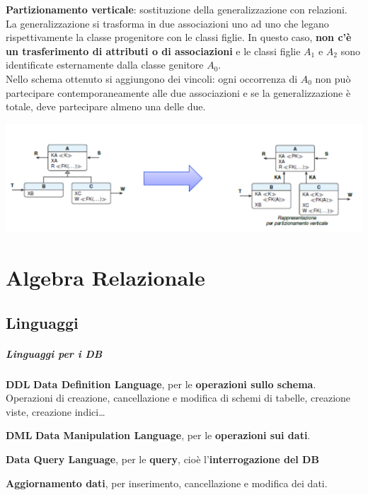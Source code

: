 \documentclass[10pt]{book}
\begin{document}
\begin{list}{}{}
\begin{center}
	\end{center}
	\item \textbf{Partizionamento verticale}: sostituzione della generalizzazione con relazioni.\\
	La generalizzazione si trasforma in due associazioni uno ad uno che legano rispettivamente la classe progenitore con le classi figlie. In questo caso, \textbf{non c'è un trasferimento di attributi o di associazioni} e le classi figlie $A_1$ e $A_2$ sono identificate esternamente dalla classe genitore $A_0$.\\
	Nello schema ottenuto si aggiungono dei vincoli: ogni occorrenza di $A_0$ non può partecipare contemporaneamente alle due associazioni e se la generalizzazione è totale, deve partecipare almeno una delle due.
	\begin{center}
		\includegraphics[scale=0.45]{partvert.png}
	\end{center}
\end{list}
\chapter{Algebra Relazionale}
\section{Linguaggi}
\paragraph{Linguaggi per i DB}
\begin{list}{}{}
	\item \textbf{DDL} \textbf{Data Definition Language}, per le \textbf{operazioni sullo schema}.\\
Operazioni di creazione, cancellazione e modifica di schemi di tabelle, creazione viste, creazione indici\ldots
	\item \textbf{DML} \textbf{Data Manipulation Language}, per le \textbf{operazioni sui dati}.\begin{list}{}{}
	\item \textbf{Data Query Language}, per le \textbf{query}, cioè l'\textbf{interrogazione del DB}
	\item \textbf{Aggiornamento dati}, per inserimento, cancellazione e modifica dei dati.
\end{list}
\end{list}
\end{document}
